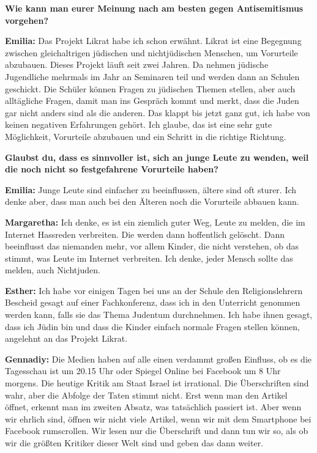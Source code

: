 \textbf{Wie kann man eurer Meinung nach am besten gegen Antisemitismus vorgehen?} 

\textbf{Emilia:} Das Projekt Likrat habe ich schon erwähnt. Likrat ist eine Begegnung zwischen gleichaltrigen jüdischen und nichtjüdischen Menschen, um Vorurteile abzubauen. Dieses Projekt läuft seit zwei Jahren. Da nehmen jüdische Jugendliche mehrmals im Jahr an Seminaren teil und werden dann an Schulen geschickt. Die Schüler können Fragen zu jüdischen Themen stellen, aber auch alltägliche Fragen, damit man ins Gespräch kommt und merkt, dass die Juden gar nicht anders sind als die anderen. Das klappt bis jetzt ganz gut, ich habe von keinen negativen Erfahrungen gehört. Ich glaube, das ist eine sehr gute Möglichkeit, Vorurteile abzubauen und ein Schritt in die richtige Richtung.                                                                                              

\textbf{Glaubst du, dass es sinnvoller ist, sich an junge Leute zu wenden, weil die noch nicht so festgefahrene Vorurteile haben?} 

\textbf{Emilia:} Junge Leute sind einfacher zu beeinflussen, ältere sind oft sturer. Ich denke aber, dass man auch bei den Älteren noch die Vorurteile abbauen kann.  

\textbf{Margaretha:} Ich denke, es ist ein ziemlich guter Weg, Leute zu melden, die im Internet Hassreden verbreiten. Die werden dann hoffentlich gelöscht. Dann beeinflusst das niemanden mehr, vor allem Kinder, die nicht verstehen, ob das stimmt, was Leute im Internet verbreiten. Ich denke, jeder Mensch sollte das melden, auch Nichtjuden. 

\textbf{Esther:} Ich habe vor einigen Tagen bei uns an der Schule den Religionslehrern Bescheid gesagt auf einer Fachkonferenz, dass ich in den Unterricht genommen werden kann, falls sie das Thema Judentum durchnehmen. Ich habe ihnen gesagt, dass ich Jüdin bin und dass die Kinder einfach normale Fragen stellen können, angelehnt an das Projekt Likrat. 

\textbf{Gennadiy:} Die Medien haben auf alle einen verdammt großen Einfluss, ob es die Tagesschau ist um 20.15 Uhr oder Spiegel Online bei Facebook um 8 Uhr morgens. Die heutige Kritik am Staat Israel ist irrational. Die Überschriften sind wahr, aber die Abfolge der Taten stimmt nicht. Erst wenn man den Artikel öffnet, erkennt man im zweiten Absatz, was tatsächlich passiert ist. Aber wenn wir ehrlich sind, öffnen wir nicht viele Artikel, wenn wir mit dem Smartphone bei Facebook rumscrollen. Wir lesen nur die Überschrift und dann tun wir so, als ob wir die größten Kritiker dieser Welt sind und geben das dann weiter.  

